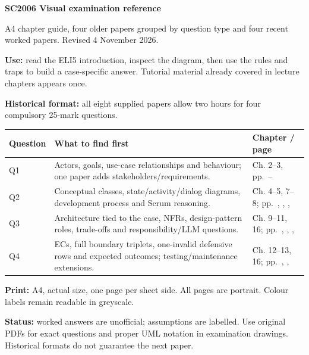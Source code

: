 \documentclass[10pt,a4paper]{article}
\begin{document}
{\color{navy}\fontsize{20}{23}\selectfont\bfseries SC2006 Visual examination reference\par}
{\small A4 chapter guide, four older papers grouped by question type and four recent worked papers. Revised 4 November 2026.}\par
\textbf{Use:} read the ELI5 introduction, inspect the diagram, then use the rules and traps to build a case-specific answer. Tutorial material already covered in lecture chapters appears once.
\par\textbf{Historical format:} all eight supplied papers allow two hours for four compulsory 25-mark questions.
\begin{longtable}{L{.12\linewidth}L{.52\linewidth}L{.28\linewidth}}
\toprule{}\textbf{Question} & \textbf{What to find first} & \textbf{Chapter / page}\\\midrule\endhead
Q1 & Actors, goals, use-case relationships and behaviour; one paper adds stakeholders/requirements. & Ch. 2--3, pp.\ \pageref{chapter-2}--\pageref{chapter-3}\\
Q2 & Conceptual classes, state/activity/dialog diagrams, development process and Scrum reasoning. & Ch. 4--5, 7--8; pp.\ \pageref{chapter-4}, \pageref{chapter-5}, \pageref{chapter-7}, \pageref{chapter-8}\\
Q3 & Architecture tied to the case, NFRs, design-pattern roles, trade-offs and responsibility/LLM questions. & Ch. 9--11, 16; pp.\ \pageref{chapter-9}, \pageref{chapter-10}, \pageref{chapter-11}, \pageref{chapter-16}\\
Q4 & ECs, full boundary triplets, one-invalid defensive rows and expected outcomes; testing/maintenance extensions. & Ch. 12--13, 16; pp.\ \pageref{chapter-12}, \pageref{chapter-13}, \pageref{chapter-16}\\
\bottomrule
\end{longtable}
\textbf{Print:} A4, actual size, one page per sheet side. All pages are portrait. Colour labels remain readable in greyscale.
\par\textbf{Status:} worked answers are unofficial; assumptions are labelled. Use original PDFs for exact questions and proper UML notation in examination drawings. Historical formats do not guarantee the next paper.
\begingroup\small
\setlength{\parskip}{0pt}
\makeatletter\renewcommand{\l@section}{\@dottedtocline{1}{0pt}{1.5em}}\makeatother
\tableofcontents
\endgroup
\clearpage

























\end{document}
